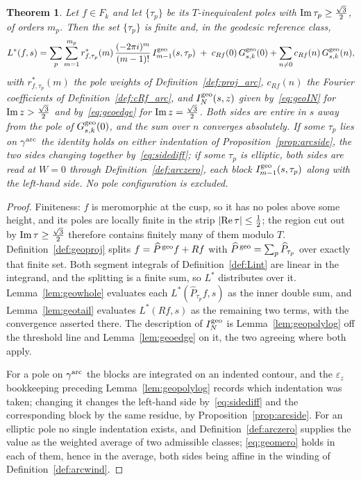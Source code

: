 \documentclass[11pt]{article}
\newtheorem{theorem}{Theorem}[section]
\begin{document}
\begin{theorem}\label{thm:geomero}
Let $f\in F_k$ and let $\{\tau_p\}$ be its $T$-inequivalent poles with
${\rm Im}\,\tau_p\ge\tfrac{\sqrt3}{2}$, of orders $m_p$. Then the set $\{\tau_p\}$ is finite
and, in the geodesic reference class,
\begin{equation}\label{eq:geomero}
L^*(f,s)=\sum_{p}\sum_{m=1}^{m_p}r^*_{f,\tau_p}(m)\,\frac{(-2\pi i)^{m}}{(m-1)!}\,
I^{\rm geo}_{m-1}(s,\tau_p)
\;+\;c_{Rf}(0)\,G^{\rm geo}_{s,k}(0)+\sum_{n\ne0}c_{Rf}(n)\,G^{\rm geo}_{s,k}(n),
\end{equation}
with $r^*_{f,\tau_p}(m)$ the pole weights of Definition~\ref{def:proj_arc}, $c_{Rf}(n)$ the
Fourier coefficients of Definition~\ref{def:cRf_arc}, and $I^{\rm geo}_N(s,z)$ given
by~\eqref{eq:geoIN} for ${\rm Im}\,z>\tfrac{\sqrt3}{2}$ and by~\eqref{eq:geoedge} for
${\rm Im}\,z=\tfrac{\sqrt3}{2}$. Both sides are entire in $s$ away from the pole of
$G^{\rm geo}_{s,k}(0)$, and the sum over $n$ converges absolutely. If some $\tau_p$ lies on
$\gamma^{\rm arc}$ the identity holds on either indentation of
Proposition~\ref{prop:arcside}, the two sides changing together by~\eqref{eq:sidediff}; if some
$\tau_p$ is elliptic, \emph{both} sides are read at $W=0$ through
Definition~\ref{def:arczero}, each block $I^{\rm geo}_{m-1}(s,\tau_p)$ along with the
left-hand side. No pole configuration is excluded.
\end{theorem}

\begin{proof}
Finiteness: $f$ is meromorphic at the cusp, so it has no poles above some height, and its poles
are locally finite in the strip $|{\rm Re}\,\tau|\le\tfrac12$; the region cut out by
${\rm Im}\,\tau\ge\tfrac{\sqrt3}{2}$ therefore contains finitely many of them modulo $T$.
Definition~\ref{def:geoproj} splits $f=\widehat P^{\,\rm geo}f+Rf$ with
$\widehat P^{\,\rm geo}=\sum_p\widehat P_{\tau_p}$ over exactly that finite set. Both segment
integrals of Definition~\ref{def:Lint} are linear in the integrand, and the splitting is a finite
sum, so $L^*$ distributes over it. Lemma~\ref{lem:geowhole} evaluates each
$L^*(\widehat P_{\tau_p}f,s)$ as the inner double sum, and Lemma~\ref{lem:geotail} evaluates
$L^*(Rf,s)$ as the remaining two terms, with the convergence asserted there. The description of
$I^{\rm geo}_N$ is Lemma~\ref{lem:geopolylog} off the threshold line and
Lemma~\ref{lem:geoedge} on it, the two agreeing where both apply.

For a pole on $\gamma^{\rm arc}$ the blocks are integrated on an indented contour, and the
$\varepsilon_z$ bookkeeping preceding Lemma~\ref{lem:geopolylog} records which indentation was
taken; changing it changes the left-hand side by~\eqref{eq:sidediff} and the corresponding block
by the same residue, by Proposition~\ref{prop:arcside}. For an elliptic pole no single indentation
exists, and Definition~\ref{def:arczero} supplies the value as the weighted average of two
admissible classes; \eqref{eq:geomero} holds in each of them, hence in the average, both sides
being affine in the winding of Definition~\ref{def:arcwind}.
\end{proof}
\end{document}
